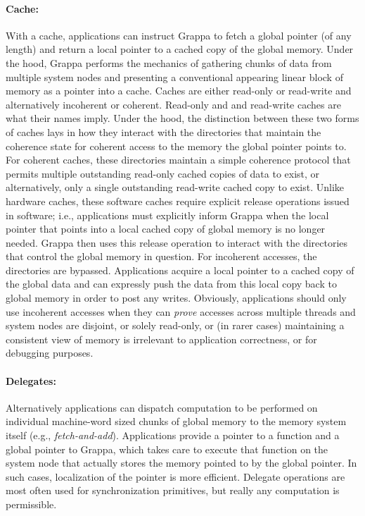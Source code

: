 \paragraph{Cache:} With a cache, applications can instruct Grappa to fetch a global pointer (of any length) and return a local pointer to a cached copy of the global memory.  Under the hood, Grappa performs the mechanics of gathering chunks of data from multiple system nodes and presenting a conventional appearing linear block of memory as a pointer into a cache.  Caches are either read-only or read-write and alternatively incoherent or coherent.  Read-only and and read-write caches are what their names imply.  Under the hood, the distinction between these two forms of caches lays in how they interact with the directories that maintain the coherence state for coherent access to the memory the global pointer points to.  For coherent caches, these directories maintain a simple coherence protocol that permits multiple outstanding read-only cached copies of data to exist, or alternatively, only a single outstanding read-write cached copy to exist.  Unlike hardware caches, these software caches require explicit release operations issued in software; i.e., applications must explicitly inform Grappa when the local pointer that points into a local cached copy of global memory is no longer needed.  Grappa then uses this release operation to interact with the directories that control the global memory in question.  For incoherent accesses, the directories are bypassed.  Applications acquire a local pointer to a cached copy of the global data and can expressly push the data from this local copy back to global memory in order to post any writes.  Obviously, applications should only use incoherent accesses when they can \emph{prove} accesses across multiple threads and system nodes are disjoint, or solely read-only, or (in rarer cases) maintaining a consistent view of memory is irrelevant to application correctness, or for debugging purposes.

\paragraph{Delegates:} Alternatively applications can dispatch computation to be performed on individual machine-word sized chunks of global memory to the memory system itself (e.g., \emph{fetch-and-add}).  Applications provide a pointer to a function and a global pointer to Grappa, which takes care to execute that function on the system node that actually stores the memory pointed to by the global pointer.  In such cases, localization of the pointer is more efficient.  Delegate operations are most often used for synchronization primitives, but really any computation is permissible.

